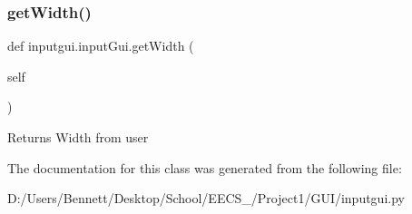 \subsubsection{\texorpdfstring{get\+Width()}{getWidth()}}
{\footnotesize\ttfamily def inputgui.\+input\+Gui.\+get\+Width (\begin{DoxyParamCaption}\item[{}]{self }\end{DoxyParamCaption})}

\begin{DoxyVerb}Returns Width from user
\end{DoxyVerb}
 

The documentation for this class was generated from the following file\+:\begin{DoxyCompactItemize}
\item 
D\+:/\+Users/\+Bennett/\+Desktop/\+School/\+E\+E\+C\+S\+\_/\+Project1/\+G\+U\+I/inputgui.\+py\end{DoxyCompactItemize}
